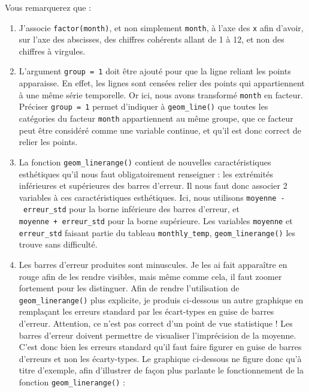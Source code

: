 \documentclass[a4paperpaper,]{article}
\providecommand{\tightlist}{%
  \setlength{\itemsep}{0pt}\setlength{\parskip}{0pt}}
\begin{document}
Vous remarquerez que :

\begin{enumerate}
\def\labelenumi{\arabic{enumi}.}
\tightlist
\item
  J'associe \texttt{factor(month)}, et non simplement \texttt{month}, à l'axe des \texttt{x} afin d'avoir, sur l'axe des abscisses, des chiffres cohérents allant de 1 à 12, et non des chiffres à virgules.
\item
  L'argument \texttt{group\ =\ 1} doit être ajouté pour que la ligne reliant les points apparaisse. En effet, les lignes sont censées relier des points qui appartiennent à une même série temporelle. Or ici, nous avons transformé \texttt{month} en facteur. Préciser \texttt{group\ =\ 1} permet d'indiquer à \texttt{geom\_line()} que toutes les catégories du facteur \texttt{month} appartiennent au même groupe, que ce facteur peut être considéré comme une variable continue, et qu'il est donc correct de relier les points.
\item
  La fonction \texttt{geom\_linerange()} contient de nouvelles caractéristiques esthétiques qu'il nous faut obligatoirement renseigner : les extrémités inférieures et supérieures des barres d'erreur. Il nous faut donc associer 2 variables à ces caractéristiques esthétiques. Ici, nous utilisons \texttt{moyenne\ -\ erreur\_std} pour la borne inférieure des barres d'erreur, et \texttt{moyenne\ +\ erreur\_std} pour la borne supérieure. Les variables \texttt{moyenne} et \texttt{erreur\_std} faisant partie du tableau \texttt{monthly\_temp}, \texttt{geom\_linerange()} les trouve sans difficulté.
\item
  Les barres d'erreur produites sont minuscules. Je les ai fait apparaître en rouge afin de les rendre visibles, mais même comme cela, il faut zoomer fortement pour les distinguer. Afin de rendre l'utilisation de \texttt{geom\_linerange()} plus explicite, je produis ci-dessous un autre graphique en remplaçant les erreurs standard par les écart-types en guise de barres d'erreur. Attention, ce n'est pas correct d'un point de vue statistique ! Les barres d'erreur doivent permettre de visualiser l'imprécision de la moyenne. C'est donc bien les erreurs standard qu'il faut faire figurer en guise de barres d'erreurs et non les écarty-types. Le graphique ci-dessous ne figure donc qu'à titre d'exemple, afin d'illustrer de façon plus parlante le fonctionnement de la fonction \texttt{geom\_linerange()} :
\end{enumerate}
\end{document}
